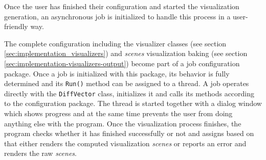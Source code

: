 Once the user has finished their configuration and started the visualization generation, an asynchronous job is initialized to handle this process in a user-friendly way.

The complete configuration including the visualizer classes (see section \ref{sec:implementation_visualizers}) and {\it scenes} visualization baking (see section \ref{sec:implementation-visualizers-output}) become part of a job configuration package. Once a job is initialized with this package, its behavior is fully determined and its \verb+Run()+ method can be assigned to a thread. A job operates directly with the \verb+DiffVector+ class, initializes it and calls its methods according to the configuration package. The thread is started together with a dialog window which shows progress and at the same time prevents the user from doing anything else with the program. Once the visualization process finishes, the program checks whether it has finished successfully or not and assigns based on that either renders the computed visualization {\it scenes} or reports an error and renders the raw {\it scenes}.